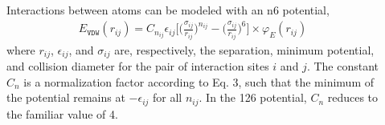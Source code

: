 \documentclass[letterpaper,10pt,english]{sphinxmanual}
\begin{document}
\begin{description}
\item[{}] \leavevmode
\sphinxAtStartPar
Interactions between atoms can be modeled with an n\sphinxhyphen{}6 potential,
\begin{equation*}
\begin{split}E_{\texttt{VDW}}(r_{ij}) = C_{n_{ij}} \epsilon_{ij} \bigg[\bigg(\frac{\sigma_{ij}}{r_{ij}}\bigg)^{n_{ij}} - \bigg(\frac{\sigma_{ij}}{r_{ij}}\bigg)^6\bigg]\times \varphi_E(r_{ij})\end{split}
\end{equation*}
\sphinxAtStartPar
where \(r_{ij}\), \(\epsilon_{ij}\), and \(\sigma_{ij}\) are, respectively, the separation, minimum potential, and collision diameter for the pair of interaction sites \(i\) and \(j\). The constant \(C_n\) is a normalization factor according to Eq. 3, such that the minimum of the potential remains at \(-\epsilon_{ij}\) for all \(n_{ij}\). In the 12\sphinxhyphen{}6 potential, \(C_n\) reduces to the familiar value of 4.


\end{description}
\end{document}
